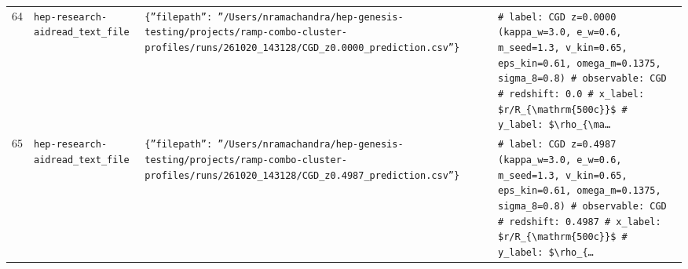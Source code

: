 \documentclass[11pt,a4paper]{article}
\begin{document}
\begin{longtable}{@{}p{}p{}p{}p{}@{}}
64 & \texttt{hep-research-aid}\newline\texttt{read\_\allowbreak{}text\_\allowbreak{}file} & \texttt{\{''filepath'':\allowbreak{} ''/\allowbreak{}Users/\allowbreak{}nramachandra/\allowbreak{}hep-genesis-testing/\allowbreak{}projects/\allowbreak{}ramp-combo-cluster-profiles/\allowbreak{}runs/\allowbreak{}261020\_\allowbreak{}143128/\allowbreak{}CGD\_\allowbreak{}z0.0000\_\allowbreak{}prediction.csv''\}\allowbreak{}} & \texttt{\# label:\allowbreak{} CGD z=\allowbreak{}0.0000 (kappa\_\allowbreak{}w=\allowbreak{}3.0,\allowbreak{} e\_\allowbreak{}w=\allowbreak{}0.6,\allowbreak{} m\_\allowbreak{}seed=\allowbreak{}1.3,\allowbreak{} v\_\allowbreak{}kin=\allowbreak{}0.65,\allowbreak{} eps\_\allowbreak{}kin=\allowbreak{}0.61,\allowbreak{} omega\_\allowbreak{}m=\allowbreak{}0.1375,\allowbreak{} sigma\_\allowbreak{}8=\allowbreak{}0.8)\allowbreak{} \# observable:\allowbreak{} CGD \# redshift:\allowbreak{} 0.0 \# x\_\allowbreak{}label:\allowbreak{} \$r/\allowbreak{}R\_\allowbreak{}\{\textbackslash{}\allowbreak{}mathrm\{500c\}\allowbreak{}\}\allowbreak{}\$ \# y\_\allowbreak{}label:\allowbreak{} \$\textbackslash{}\allowbreak{}rho\_\allowbreak{}\{\textbackslash{}\allowbreak{}ma\ldots{}\allowbreak{}} \\
65 & \texttt{hep-research-aid}\newline\texttt{read\_\allowbreak{}text\_\allowbreak{}file} & \texttt{\{''filepath'':\allowbreak{} ''/\allowbreak{}Users/\allowbreak{}nramachandra/\allowbreak{}hep-genesis-testing/\allowbreak{}projects/\allowbreak{}ramp-combo-cluster-profiles/\allowbreak{}runs/\allowbreak{}261020\_\allowbreak{}143128/\allowbreak{}CGD\_\allowbreak{}z0.4987\_\allowbreak{}prediction.csv''\}\allowbreak{}} & \texttt{\# label:\allowbreak{} CGD z=\allowbreak{}0.4987 (kappa\_\allowbreak{}w=\allowbreak{}3.0,\allowbreak{} e\_\allowbreak{}w=\allowbreak{}0.6,\allowbreak{} m\_\allowbreak{}seed=\allowbreak{}1.3,\allowbreak{} v\_\allowbreak{}kin=\allowbreak{}0.65,\allowbreak{} eps\_\allowbreak{}kin=\allowbreak{}0.61,\allowbreak{} omega\_\allowbreak{}m=\allowbreak{}0.1375,\allowbreak{} sigma\_\allowbreak{}8=\allowbreak{}0.8)\allowbreak{} \# observable:\allowbreak{} CGD \# redshift:\allowbreak{} 0.4987 \# x\_\allowbreak{}label:\allowbreak{} \$r/\allowbreak{}R\_\allowbreak{}\{\textbackslash{}\allowbreak{}mathrm\{500c\}\allowbreak{}\}\allowbreak{}\$ \# y\_\allowbreak{}label:\allowbreak{} \$\textbackslash{}\allowbreak{}rho\_\allowbreak{}\{\ldots{}\allowbreak{}} \\

\end{longtable}
\end{document}
